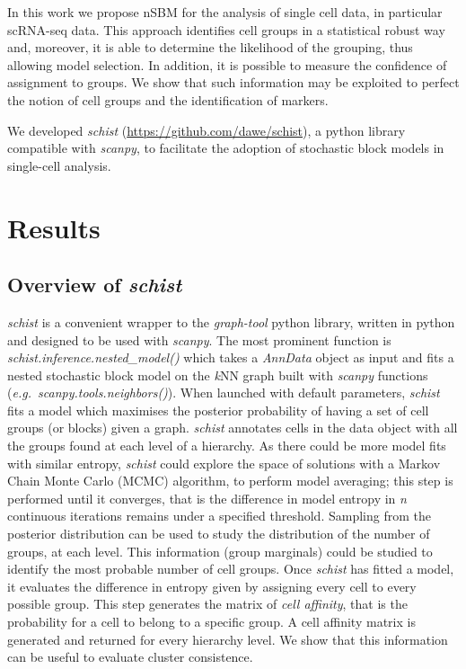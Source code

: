 \documentclass[10pt]{article}
\begin{document}
In this work we propose nSBM for the analysis of single cell data, in particular scRNA-seq data. This approach identifies cell groups in a statistical robust way and, moreover, it is able to determine the likelihood of the grouping, thus allowing model selection. In addition, it is possible to measure the confidence of assignment to groups. We show that such information may be exploited to perfect the notion of cell groups and the identification of markers.

We developed \emph{schist} (\href{https://github.com/dawe/schist}{https:/\slash github.com\slash dawe\slash schist}), a python library compatible with \emph{scanpy}, to facilitate the adoption of stochastic block models in single-cell analysis.

\section*{Results}

\subsection*{Overview of \emph{schist}}

\emph{schist} is a convenient wrapper to the \emph{graph-tool} python library, written in python and designed to be used with \emph{scanpy}. The most prominent function is \emph{schist.inference.nested\_model()} which takes a \emph{AnnData} object as input and fits a nested stochastic block model on the \emph{k}NN graph built with \emph{scanpy} functions (\emph{e.g.\ scanpy.tools.neighbors()}). When launched with default parameters, \emph{schist} fits a model which maximises the posterior probability of having a set of cell groups (or blocks) given a graph. \emph{schist} annotates cells in the data object with all the groups found at each level of a hierarchy. As there could be more model fits with similar entropy, \emph{schist} could explore the space of solutions with a Markov Chain Monte Carlo (MCMC) algorithm, to perform model averaging; this step is performed until it converges, that is the difference in model entropy in \emph{n} continuous iterations remains under a specified threshold. Sampling from the posterior distribution can be used to study the distribution of the number of groups, at each level. This information (group marginals) could be studied to identify the most probable number of cell groups.
Once \emph{schist} has fitted a model, it evaluates the difference in entropy given by assigning every cell to every possible group. This step generates the matrix of \emph{cell affinity}, that is the probability for a cell to belong to a specific group. A cell affinity matrix is generated and returned for every hierarchy level. We show that this information can be useful to evaluate cluster consistence.
\end{document}
